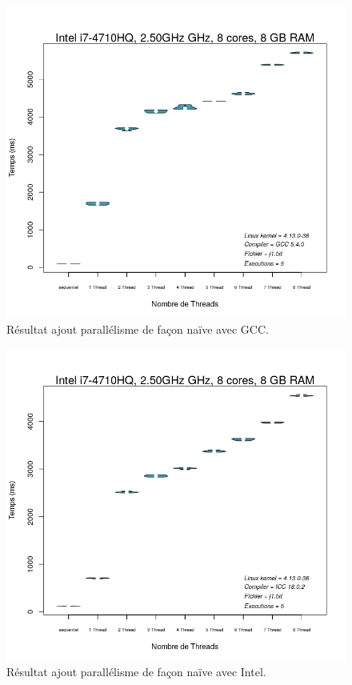 \documentclass[
 aip,
 jmp,
 amsmath,amssymb,
 reprint
]{revtex4-1}
\begin{document}
\begin{figure}[H]
  \includegraphics[width=\linewidth, keepaspectratio=true]{gcc_parallel_naif.png}
  \caption{Résultat ajout parallélisme de façon naïve avec GCC.\label{Fig:gcc_naif}}
\end{figure}

\begin{figure}[H]
  \includegraphics[width=\linewidth, keepaspectratio=true]{intel_parallel_naif.png}
  \caption{Résultat ajout parallélisme de façon naïve avec Intel.\label{Fig:intel_naif}}
\end{figure}
\end{document}
